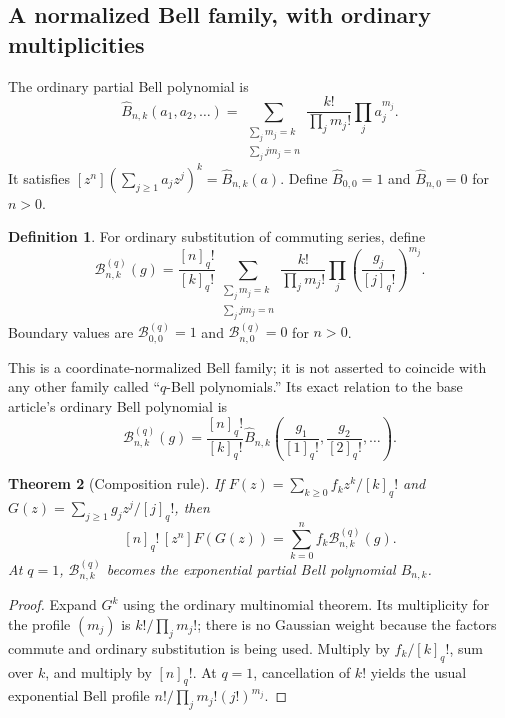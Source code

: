 \documentclass[11pt,a4paper]{article}
\numberwithin{equation}{section}
\newtheorem{theorem}{Theorem}[section]
\theoremstyle{definition}
\newtheorem{definition}[theorem]{Definition}
\theoremstyle{remark}
\newcommand{\qf}[1]{[#1]_{q}!}
\newcommand{\Bhat}{\widehat B}
\newcommand{\Bq}{\mathcal B^{(q)}}
\begin{document}
\subsection{A normalized Bell family, with ordinary multiplicities}
The ordinary partial Bell polynomial is
\[
 \Bhat_{n,k}(a_1,a_2,\ldots)
 =\sum_{\substack{\sum_jm_j=k\\\sum_jjm_j=n}}
          \frac{k!}{\prod_jm_j!}\prod_ja_j^{m_j}.
\]
It satisfies $[z^n](\sum_{j\ge1}a_jz^j)^k=\Bhat_{n,k}(a)$.
Define $\Bhat_{0,0}=1$ and $\Bhat_{n,0}=0$ for $n>0$.

\begin{definition}\label{def:Bq}
For ordinary substitution of commuting series, define
\begin{equation}\label{eq:Bq-def}
 \Bq_{n,k}(g)
 =\frac{\qf n}{\qf k}
   \sum_{\substack{\sum_jm_j=k\\\sum_jjm_j=n}}
       \frac{k!}{\prod_jm_j!}
       \prod_j\left(\frac{g_j}{\qf j}\right)^{m_j}.
\end{equation}
Boundary values are $\Bq_{0,0}=1$ and $\Bq_{n,0}=0$ for $n>0$.
\end{definition}
This is a coordinate-normalized Bell family; it is not asserted to coincide with
any other family called ``$q$-Bell polynomials.'' Its exact relation to the base
article's ordinary Bell polynomial is
\begin{equation}\label{eq:Bq-conversion}
 \Bq_{n,k}(g)=\frac{\qf n}{\qf k}
           \Bhat_{n,k}\left(\frac{g_1}{\qf1},\frac{g_2}{\qf2},\ldots\right).
\end{equation}

\begin{theorem}[Composition rule]\label{thm:qcomposition}
If
$F(z)=\sum_{k\ge0}f_kz^k/\qf k$ and
$G(z)=\sum_{j\ge1}g_jz^j/\qf j$, then
\begin{equation}\label{eq:qcomposition}
 \qf n\,[z^n]F(G(z))=\sum_{k=0}^nf_k\Bq_{n,k}(g).
\end{equation}
At $q=1$, $\Bq_{n,k}$ becomes the exponential partial Bell polynomial $B_{n,k}$.
\end{theorem}
\begin{proof}
Expand $G^k$ using the ordinary multinomial theorem. Its multiplicity for the
profile $(m_j)$ is $k!/\prod_jm_j!$; there is no Gaussian weight because the
factors commute and ordinary substitution is being used. Multiply by
$f_k/\qf k$, sum over $k$, and multiply by $\qf n$. At $q=1$, cancellation of
$k!$ yields the usual exponential Bell profile $n!/\prod_jm_j!(j!)^{m_j}$.
\end{proof}
\end{document}
